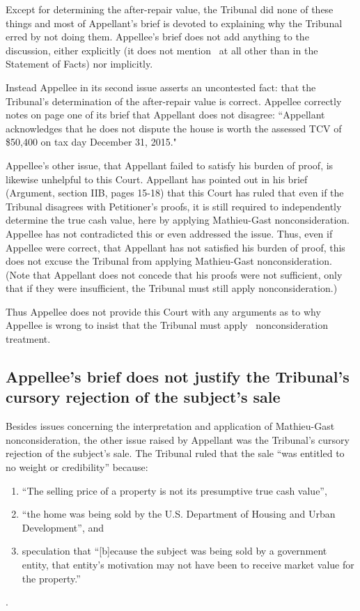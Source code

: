 \documentclass[12pt,\documentclassflag]{michiganCourtOfAppealsBrief}
\begin{document}
Except for determining the after-repair value, the Tribunal did none of these things and most of Appellant's brief is devoted to explaining why the Tribunal erred by not doing them. Appellee's brief does not add anything to the discussion, either explicitly (it does not mention \mathieuGast\ at all other than in the Statement of Facts) nor implicitly.

Instead Appellee in its second issue asserts an uncontested fact: that the Tribunal's determination of the after-repair value is correct. Appellee correctly notes on page one of its brief that Appellant does not disagree: ``Appellant acknowledges that he does not dispute the house is worth the assessed TCV of \$50,400 on tax day December 31, 2015."

Appellee's other issue, that Appellant failed to satisfy his burden of proof, is likewise unhelpful to this Court. Appellant has pointed out in his brief (Argument, section IIB, pages 15-18) that this Court has ruled that even if the Tribunal disagrees with Petitioner's proofs, it is still required to independently determine the true cash value, here by applying Mathieu-Gast nonconsideration. Appellee has not contradicted this or even addressed the issue. Thus, even if Appellee were correct, that Appellant has not satisfied his burden of proof, this does not excuse the Tribunal from applying Mathieu-Gast nonconsideration. (Note that Appellant does not concede that his proofs were not sufficient, only that if they were insufficient, the Tribunal must still apply nonconsideration.)

Thus Appellee does not provide this Court with any arguments as to why Appellee is wrong to insist that the Tribunal must apply \mathieuGast\ nonconsideration treatment.

\subsection{Appellee's brief does not justify the Tribunal's cursory rejection of the subject's sale}

Besides issues concerning the interpretation and application of Mathieu-Gast nonconsideration, the other issue raised by Appellant was the Tribunal's cursory rejection of the subject's sale. The Tribunal ruled that the sale ``was entitled to no weight or credibility'' because:

\begin{enumerate}
\item ``The selling price of a property is not its presumptive true cash value'',
\item ``the home was being sold by the U.S. Department of Housing and Urban Development'', and
\item speculation that ``[b]ecause the subject was being sold by a government entity, that entity's motivation may not have been to receive market value for the property.''
\end{enumerate}
\reconsiderationDenied[2].
\end{document}
